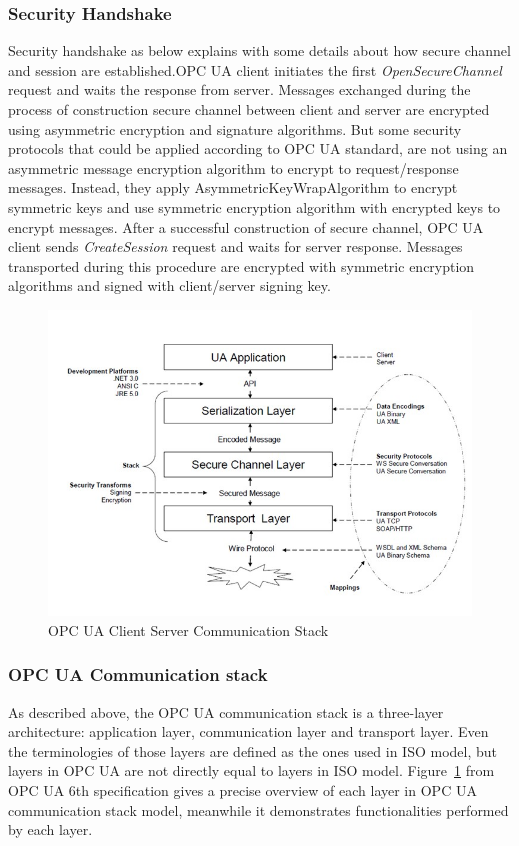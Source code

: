 \documentclass[]{llncs}
\begin{document}
\subsubsection{Security Handshake}
Security handshake as below explains with some details about how secure channel and session are established.OPC UA client initiates the first \emph{OpenSecureChannel} request and waits the response from server. Messages exchanged during the process of construction secure channel between client and server are encrypted using asymmetric encryption and signature algorithms. But some security protocols that could be applied according to OPC UA standard, are not using an asymmetric message encryption algorithm to encrypt to request/response messages. Instead, they apply AsymmetricKeyWrapAlgorithm to encrypt symmetric keys and use symmetric encryption algorithm with encrypted keys to encrypt messages. After a successful construction of secure channel, OPC UA client sends \emph{CreateSession} request and waits for server response. Messages transported during this procedure are encrypted with symmetric encryption algorithms and signed with client/server signing key.
\begin{figure}[!htbp]
	\centering
	\includegraphics[width=1\textwidth]{opc_ua_commstack.jpg}
		\caption[ ]{OPC UA Client Server Communication Stack\cite{O2}}
	\label{fig:opc_ua_commstack}
\end{figure}

\subsubsection{OPC UA Communication stack}
As described above, the OPC UA communication stack is a three-layer architecture: application layer, communication layer and transport layer. Even the terminologies of those layers are defined as the ones used in ISO model, but layers in OPC UA are not directly equal to layers in ISO model. Figure~\ref{fig:opc_ua_commstack} from OPC UA  6th specification\cite{O6} gives a precise overview of each layer in OPC UA communication stack model, meanwhile it demonstrates functionalities performed by each layer.
\end{document}
